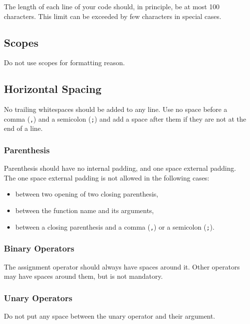 \documentclass[a4paper]{article}
\newcommand{\inlinecode}[1]{\lstinline|#1|}
\begin{document}
The length of each line of your code should, in principle, be at most 100 characters. This limit can be exceeded by few characters in special cases.

\subsection{Scopes}

Do not use scopes for formatting reason.

\subsection{Horizontal Spacing}

No trailing whitespaces should be added to any line.
Use no space before a comma (\inlinecode{,}) and a semicolon (\inlinecode{;}) and add a space after them if they are not at the end of a line.

\subsubsection{Parenthesis}

Parenthesis should have no internal padding, and one space external padding.
The one space external padding is not allowed in the following cases:
\begin{itemize} \itemsep -3pt
 \vspace{-2ex}
 \item between two opening of two closing parenthesis,
 \item between the function name and its arguments,
 \item between a closing parenthesis and a comma (\inlinecode{,}) or a semicolon (\inlinecode{;}).
\end{itemize}

\subsubsection{Binary Operators}

The assignment operator should always have spaces around it. Other operators may have spaces around them, but is not mandatory.

\subsubsection{Unary Operators}

Do not put any space between the unary operator and their argument.
\end{document}
